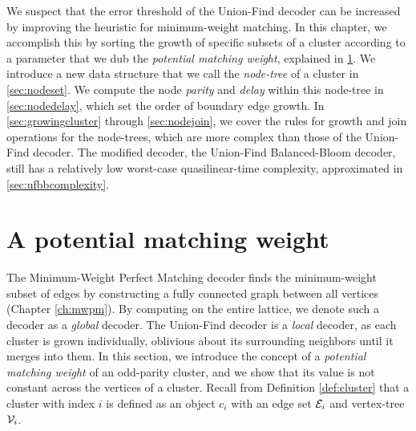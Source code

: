 We suspect that the error threshold of the Union-Find decoder can be increased by improving the heuristic for minimum-weight matching. In this chapter, we accomplish this by sorting the growth of specific subsets of a cluster according to a parameter that we dub the \emph{potential matching weight}, explained in \ref{sec:PMW}. We introduce a new data structure that we call the \emph{node-tree} of a cluster in \ref{sec:nodeset}. We compute the node \emph{parity} and \emph{delay} within this node-tree in \ref{sec:nodedelay}, which set the order of boundary edge growth. In \ref{sec:growingcluster} through \ref{sec:nodejoin}, we cover the rules for growth and join operations for the node-trees, which are more complex than those of the Union-Find decoder. The modified decoder, the Union-Find Balanced-Bloom decoder, still has a relatively low worst-case quasilinear-time complexity, approximated in \ref{sec:ufbbcomplexity}. 

\section{A potential matching weight}\label{sec:PMW}

The Minimum-Weight Perfect Matching decoder finds the minimum-weight subset of edges by constructing a fully connected graph between all vertices (Chapter \ref{ch:mwpm}). By computing on the entire lattice, we denote such a decoder as a \emph{global} decoder. The Union-Find decoder is a \emph{local} decoder, as each cluster is grown individually, oblivious about its surrounding neighbors until it merges into them. In this section, we introduce the concept of a \emph{potential matching weight} of an odd-parity cluster, and we show that its value is not constant across the vertices of a cluster. Recall from Definition \ref{def:cluster} that a cluster with index $i$ is defined as an object $c_i$ with an edge set $\mathcal{E}_i$ and vertex-tree $\mathcal{V}_i$.

